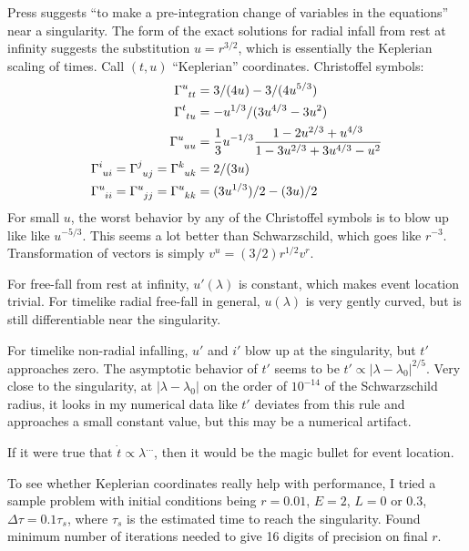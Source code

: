 \documentclass{article}
\begin{document}
Press suggests ``to make
a pre-integration change of variables in the equations'' near a singularity.
The form of the exact solutions for radial infall from rest at infinity suggests
the substitution $u=r^{3/2}$, which is essentially the Keplerian scaling of times.
Call $(t,u)$ ``Keplerian'' coordinates. Christoffel symbols:
\begin{align*}
\Gamma\indices{^u_t_t} &= 3/(4u)-3/(4u^{5/3})  \\
\Gamma\indices{^t_t_u} &= -u^{1/3}/(3u^{4/3}-3u^2)  \\
\Gamma\indices{^u_u_u} &= \frac{1}{3}u^{-1/3}\frac{1-2u^{2/3}+u^{4/3}}{1-3u^{2/3}+3u^{4/3}-u^2} \\
\Gamma\indices{^i_u_i} = \Gamma\indices{^j_u_j} = \Gamma\indices{^k_u_k} &= 2/(3u)  \\
\Gamma\indices{^u_i_i} = \Gamma\indices{^u_j_j} = \Gamma\indices{^u_k_k} &= (3u^{1/3})/2-(3u)/2  
\end{align*}
For small $u$, the worst behavior by any of the Christoffel symbols is
to blow up like like $u^{-5/3}$. This seems a lot better than
Schwarzschild, which goes like $r^{-3}$. Transformation of vectors is simply
$v^u=(3/2)r^{1/2}v^r$.

For free-fall from rest at infinity, $u'(\lambda)$ is
constant, which makes event location trivial. For timelike radial free-fall in general,
$u(\lambda)$ is very gently curved, but is still differentiable near the singularity.

For timelike non-radial infalling, $u'$ and $i'$ blow up at the singularity, but
$t'$ approaches zero. The asymptotic behavior of $t'$ seems to be
$t'\propto|\lambda-\lambda_0|^{2/5}$. Very close to the singularity,
at $|\lambda-\lambda_0|$ on the order of $10^{-14}$ of the Schwarzschild radius,
it looks in my numerical data like $t'$ deviates from this rule and approaches
a small constant value, but this may be a numerical artifact.

If it were true that $\dot{t}\propto \lambda^{\ldots}$, then it would be the magic bullet for
event location.

To see whether Keplerian coordinates really help with performance, I tried a sample
problem with initial conditions being $r=0.01$, $E=2$, $L=0$ or $0.3$, $\Delta\tau=0.1\tau_s$,
where $\tau_s$ is the estimated time to reach the singularity. Found minimum
number of iterations needed to give 16 digits of precision on final $r$.
\end{document}
